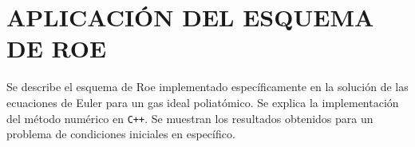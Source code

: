 \chapter{APLICACIÓN DEL ESQUEMA DE ROE}
Se describe el esquema de Roe implementado específicamente en la solución de las ecuaciones de Euler para un gas ideal poliatómico. Se explica la implementación del método numérico en \texttt{C++}. Se muestran los resultados obtenidos para un problema de condiciones iniciales en específico.